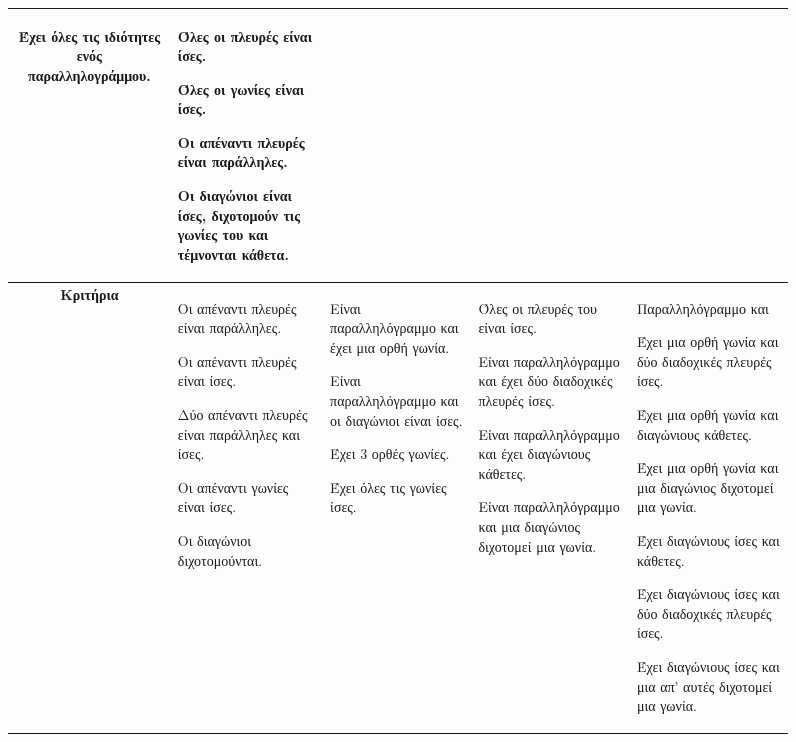 \documentclass[twoside,nofonts,internet,shmeiwseis]{thewria}
\begin{document}
\begin{sidewaysfigure}
\begin{tabular}{c|>{\centering\arraybackslash}m{5.3cm}|>{\centering\arraybackslash}m{4.5cm}|>{\centering\arraybackslash}m{5.5cm}|>{\centering\arraybackslash}m{6.5cm}}
\begin{rlist}[leftmargin=5mm]
\vspace{-3mm}
\item Έχει όλες τις ιδιότητες ενός παραλληλογράμμου.
\end{rlist} & \begin{rlist}[leftmargin=5mm]
\item Όλες οι πλευρές είναι ίσες.
\item Όλες οι γωνίες είναι ίσες.
\item Οι απέναντι πλευρές είναι παράλληλες.
\item Οι διαγώνιοι είναι ίσες, διχοτομούν τις γωνίες του και τέμνονται κάθετα.
\end{rlist} \\
\hline\rule[-2ex]{0pt}{5.5ex}\textbf{Κριτήρια}  & \begin{rlist}[leftmargin=5mm]
\item Οι απέναντι πλευρές είναι παράλληλες.
\item Οι απέναντι πλευρές είναι ίσες.
\item Δύο απέναντι πλευρές είναι παράλληλες και ίσες.
\item Οι απέναντι γωνίες είναι ίσες.
\item Οι διαγώνιοι διχοτομούνται.
\end{rlist} & \begin{rlist}[leftmargin=5mm]
\item Είναι παραλληλόγραμμο και έχει μια ορθή γωνία.
\item Είναι παραλληλόγραμμο και οι διαγώνιοι είναι ίσες.
\item Έχει 3 ορθές γωνίες.
\item Έχει όλες τις γωνίες ίσες.
\end{rlist} & \begin{rlist}[leftmargin=5mm]
\item Όλες οι πλευρές του είναι ίσες.
\item Είναι παραλληλόγραμμο και έχει δύο διαδοχικές πλευρές ίσες.
\item Είναι παραλληλόγραμμο και έχει διαγώνιους κάθετες.
\item Είναι παραλληλόγραμμο και μια διαγώνιος διχοτομεί μια γωνία.
\end{rlist} & Παραλληλόγραμμο και
\begin{rlist}[leftmargin=5mm]
\item Έχει μια ορθή γωνία και δύο διαδοχικές πλευρές ίσες.
\item Έχει μια ορθή γωνία και διαγώνιους κάθετες.
\item Έχει μια ορθή γωνία και μια διαγώνιος διχοτομεί μια γωνία.
\item Έχει διαγώνιους ίσες και κάθετες.
\item Έχει διαγώνιους ίσες και δύο διαδοχικές πλευρές ίσες.
\item Έχει διαγώνιους ίσες και μια απ' αυτές διχοτομεί μια γωνία.
\end{rlist} \\
\hline
\end{tabular}
\end{sidewaysfigure}
\end{document}
